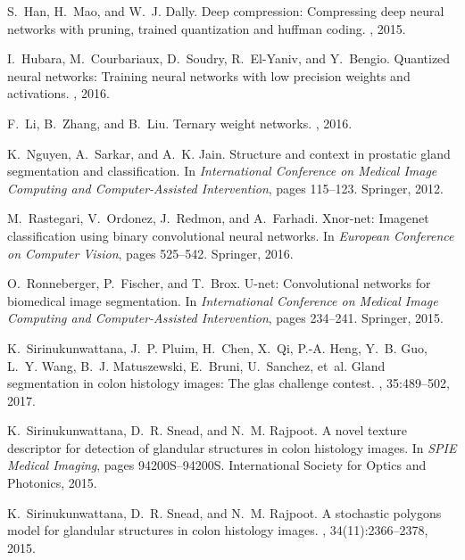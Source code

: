 \documentclass[10pt,twocolumn,letterpaper]{article}
\begin{document}
{\begin{thebibliography}{10}
S.~Han, H.~Mao, and W.~J. Dally.
\newblock Deep compression: Compressing deep neural networks with pruning,
  trained quantization and huffman coding.
, 2015.

I.~Hubara, M.~Courbariaux, D.~Soudry, R.~El-Yaniv, and Y.~Bengio.
\newblock Quantized neural networks: Training neural networks with low
  precision weights and activations.
, 2016.

F.~Li, B.~Zhang, and B.~Liu.
\newblock Ternary weight networks.
, 2016.

K.~Nguyen, A.~Sarkar, and A.~K. Jain.
\newblock Structure and context in prostatic gland segmentation and
  classification.
\newblock In {\em International Conference on Medical Image Computing and
  Computer-Assisted Intervention}, pages 115--123. Springer, 2012.

M.~Rastegari, V.~Ordonez, J.~Redmon, and A.~Farhadi.
\newblock Xnor-net: Imagenet classification using binary convolutional neural
  networks.
\newblock In {\em European Conference on Computer Vision}, pages 525--542.
  Springer, 2016.

O.~Ronneberger, P.~Fischer, and T.~Brox.
\newblock U-net: Convolutional networks for biomedical image segmentation.
\newblock In {\em International Conference on Medical Image Computing and
  Computer-Assisted Intervention}, pages 234--241. Springer, 2015.

K.~Sirinukunwattana, J.~P. Pluim, H.~Chen, X.~Qi, P.-A. Heng, Y.~B. Guo, L.~Y.
  Wang, B.~J. Matuszewski, E.~Bruni, U.~Sanchez, et~al.
\newblock Gland segmentation in colon histology images: The glas challenge
  contest.
, 35:489--502, 2017.

K.~Sirinukunwattana, D.~R. Snead, and N.~M. Rajpoot.
\newblock A novel texture descriptor for detection of glandular structures in
  colon histology images.
\newblock In {\em SPIE Medical Imaging}, pages 94200S--94200S. International
  Society for Optics and Photonics, 2015.

K.~Sirinukunwattana, D.~R. Snead, and N.~M. Rajpoot.
\newblock A stochastic polygons model for glandular structures in colon
  histology images.
, 34(11):2366--2378, 2015.


\end{thebibliography}}
\end{document}

